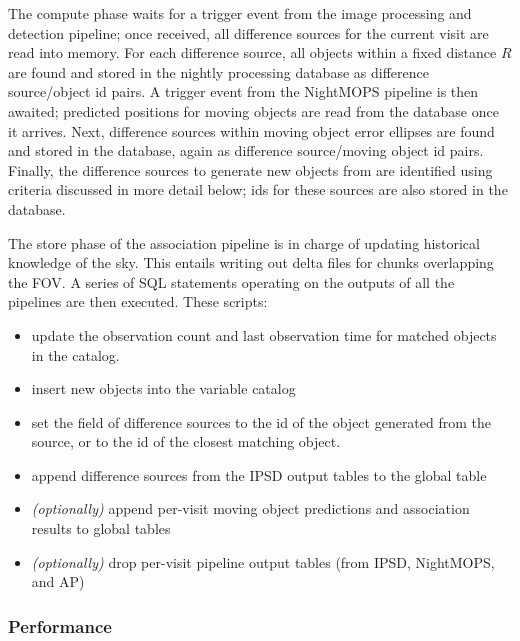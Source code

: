 The compute phase waits for a trigger event from the image processing and
detection pipeline; once received, all difference sources for the current
visit are read into memory. For each difference source, all objects within a
fixed distance $R$ are found and stored in the nightly processing database as
difference source/object id pairs. A trigger event from the NightMOPS
pipeline is then awaited; predicted positions for moving objects are read from
the database once it arrives. Next, difference sources within moving object
error ellipses are found and stored in the database, again as difference
source/moving object id pairs. Finally, the difference sources to generate new
objects from are identified using criteria discussed in more detail below; ids
for these sources are also stored in the database.

The store phase of the association pipeline is in charge of updating
historical knowledge of the sky. This entails writing out delta files for
chunks overlapping the FOV. A series of SQL statements operating on the
outputs of all the pipelines are then executed. These scripts:

\begin{itemize}
\item update the observation count and last observation time for matched
      objects in the  catalog.

\item insert new objects into the variable  catalog

\item set the  field of difference sources to the id of the
      object generated from the source, or to the id of the closest matching
      object.

\item append difference sources from the IPSD output tables to the global
       table

\item \emph{(optionally)} append per-visit moving object predictions and
      association results to global tables

\item \emph{(optionally)} drop per-visit pipeline output tables (from IPSD,
      NightMOPS, and AP)
\end{itemize}

\subsubsection{Performance}

